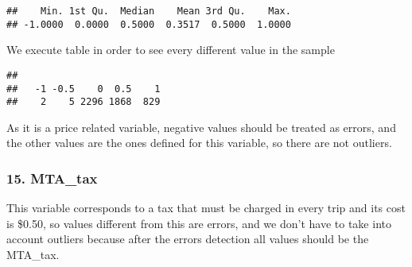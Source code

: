 \documentclass[
  18pt,
  a4paper]{article}
\newenvironment{Shaded}{\begin{snugshade}}{\end{snugshade}}
\newcommand{\CommentTok}[1]{\textcolor[rgb]{0.56,0.35,0.01}{\textit{#1}}}
\newcommand{\DecValTok}[1]{\textcolor[rgb]{0.00,0.00,0.81}{#1}}
\newcommand{\KeywordTok}[1]{\textcolor[rgb]{0.13,0.29,0.53}{\textbf{#1}}}
\newcommand{\NormalTok}[1]{#1}
\newcommand{\OperatorTok}[1]{\textcolor[rgb]{0.81,0.36,0.00}{\textbf{#1}}}
\newcommand{\OtherTok}[1]{\textcolor[rgb]{0.56,0.35,0.01}{#1}}
\newcommand{\StringTok}[1]{\textcolor[rgb]{0.31,0.60,0.02}{#1}}
\begin{document}
\begin{Shaded}
\end{Shaded}

\begin{verbatim}
##    Min. 1st Qu.  Median    Mean 3rd Qu.    Max. 
## -1.0000  0.0000  0.5000  0.3517  0.5000  1.0000
\end{verbatim}

We execute table in order to see every different value in the sample

\begin{Shaded}
\end{Shaded}

\begin{verbatim}
## 
##   -1 -0.5    0  0.5    1 
##    2    5 2296 1868  829
\end{verbatim}

As it is a price related variable, negative values should be treated as
errors, and the other values are the ones defined for this variable, so
there are not outliers.

\begin{Shaded}
\end{Shaded}

\hypertarget{mta_tax}{%
\subsubsection{15. MTA\_tax}\label{mta_tax}}

This variable corresponds to a tax that must be charged in every trip
and its cost is \$0.50, so values different from this are errors, and we
don't have to take into account outliers because after the errors
detection all values should be the MTA\_tax.
\end{document}
